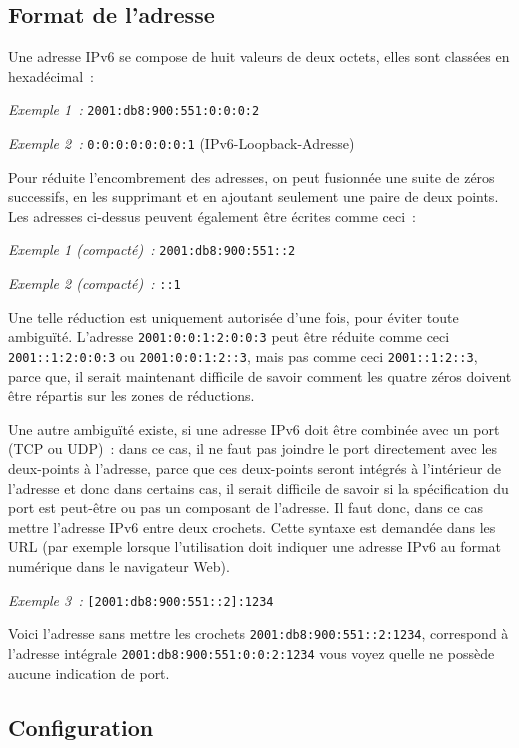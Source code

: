 \subsection{Format de l'adresse}

Une adresse IPv6 se compose de huit valeurs de deux octets, elles sont classées
en hexadécimal~:

\emph{Exemple 1~:} \verb*?2001:db8:900:551:0:0:0:2?

\emph{Exemple 2~:} \verb*?0:0:0:0:0:0:0:1? (IPv6-Loopback-Adresse)

Pour réduite l'encombrement des adresses, on peut fusionnée une suite de zéros
successifs, en les supprimant et en ajoutant seulement une paire de deux points.
Les adresses ci-dessus peuvent également être écrites comme ceci~:

\emph{Exemple 1 (compacté)~:} \verb*?2001:db8:900:551::2?

\emph{Exemple 2 (compacté)~:} \verb*?::1?

Une telle réduction est uniquement autorisée d'une fois, pour éviter toute
ambiguïté. L'adresse \verb*?2001:0:0:1:2:0:0:3? peut être réduite comme
ceci \verb*?2001::1:2:0:0:3? ou \verb*?2001:0:0:1:2::3?, mais pas comme ceci
\verb*?2001::1:2::3?, parce que, il serait maintenant difficile de savoir comment
les quatre zéros doivent être répartis sur les zones de réductions.

Une autre ambiguïté existe, si une adresse IPv6 doit être combinée avec un port
(TCP ou UDP)~: dans ce cas, il ne faut pas joindre le port directement avec les
deux-points à l'adresse, parce que ces deux-points seront intégrés à
l'intérieur de l'adresse et donc dans certains cas, il serait difficile de
savoir si la spécification du port est peut-être ou pas un composant de
l'adresse. Il faut donc, dans ce cas mettre l'adresse IPv6 entre deux crochets.
Cette syntaxe est demandée dans les URL (par exemple lorsque l'utilisation doit
indiquer une adresse IPv6 au format numérique dans le navigateur Web).

\emph{Exemple 3~:} \verb*?[2001:db8:900:551::2]:1234?

Voici l'adresse sans mettre les crochets \verb*?2001:db8:900:551::2:1234?,
correspond à l'adresse intégrale \verb*?2001:db8:900:551:0:0:2:1234? vous voyez
quelle ne possède aucune indication de port.

\subsection{Configuration}

